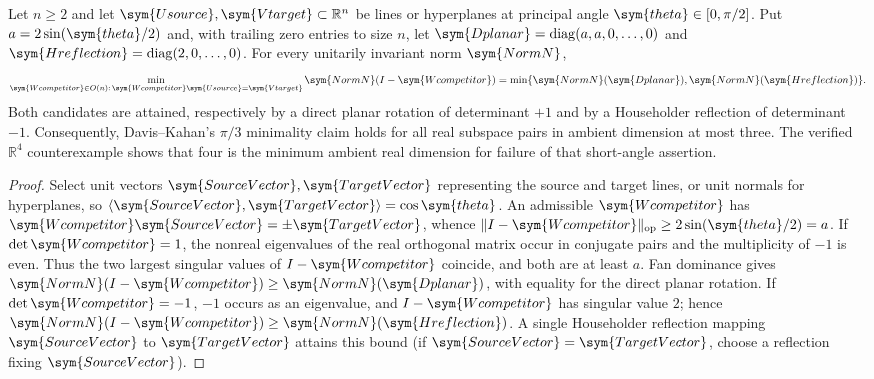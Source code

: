 \ifincludeUnformalizedRealTransport
\begin{tcolorbox}[
 enhanced,breakable,colback=white,colframe=red!80!black,
 colbacktitle=red!6!white,coltitle=red!80!black,
 title={Working extension --- real rank-one and codimension-one transport},
 fonttitle=\bfseries,boxrule=1pt,
 left=9pt,right=9pt,top=9pt,bottom=9pt,
 before skip=12pt,after skip=12pt]
\begin{proposition}
Let $n\geq2$ and let $\sym{Usource},\sym{Vtarget}\subset\mathbb R^n$ be lines or hyperplanes
at principal angle $\sym{theta}\in[0,\pi/2]$. Put
$a=2\sin(\sym{theta}/2)$ and, with trailing zero entries to size $n$, let
$\sym{Dplanar}=\operatorname{diag}(a,a,0,\ldots,0)$ and
$\sym{Hreflection}=\operatorname{diag}(2,0,\ldots,0)$. For every unitarily invariant
norm $\sym{NormN}$,
\[
  \min_{\sym{Wcompetitor}\in O(n):\,\sym{Wcompetitor}\sym{Usource}=\sym{Vtarget}} \sym{NormN}(I-\sym{Wcompetitor})
    =\min\{\sym{NormN}(\sym{Dplanar}),\sym{NormN}(\sym{Hreflection})\}.
\]
Both candidates are attained, respectively by a direct planar rotation
of determinant $+1$ and by a Householder reflection of determinant $-1$.
Consequently, Davis--Kahan's $\pi/3$ minimality claim holds for all
real subspace pairs in ambient dimension at most three. The verified
$\mathbb R^4$ counterexample shows that four is the minimum ambient
real dimension for failure of that short-angle assertion.
\end{proposition}
\begin{proof}
Select unit vectors $\sym{SourceVector},\sym{TargetVector}$ representing the source and target lines,
or unit normals for hyperplanes, so $\langle \sym{SourceVector},\sym{TargetVector}\rangle=\cos\sym{theta}$.
An admissible $\sym{Wcompetitor}$ has $\sym{Wcompetitor}\sym{SourceVector}=\pm \sym{TargetVector}$, whence
$\|I-\sym{Wcompetitor}\|_{\rm op}\geq 2\sin(\sym{theta}/2)=a$.
If $\det \sym{Wcompetitor}=1$, the nonreal eigenvalues of the real orthogonal matrix
occur in conjugate pairs and the multiplicity of $-1$ is even.
Thus the two largest singular values of $I-\sym{Wcompetitor}$ coincide, and both are
at least $a$. Fan dominance gives $\sym{NormN}(I-\sym{Wcompetitor})\geq \sym{NormN}(\sym{Dplanar})$, with equality
for the direct planar rotation. If $\det \sym{Wcompetitor}=-1$, $-1$ occurs as an
eigenvalue, and $I-\sym{Wcompetitor}$ has singular value $2$; hence
$\sym{NormN}(I-\sym{Wcompetitor})\geq \sym{NormN}(\sym{Hreflection})$. A single Householder reflection mapping $\sym{SourceVector}$
to $\sym{TargetVector}$ attains this bound (if $\sym{SourceVector}=\sym{TargetVector}$, choose a reflection fixing $\sym{SourceVector}$).

\end{proof}
\end{tcolorbox}

